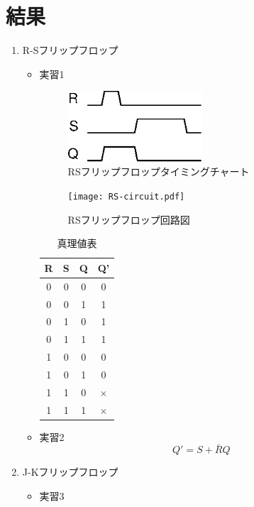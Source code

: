 \documentclass[dvipdfmx]{jsarticle}
\begin{document}
	\section{結果}
		\begin{enumerate}
			\item R-Sフリップフロップ
				\begin{itemize}
					\item 実習1
						\begin{figure}
							\center
							\includegraphics[width=5cm]{rs.eps}
							\caption{RSフリップフロップタイミングチャート}
						\end{figure}
						\begin{figure}
							\center
							\texttt{[image: RS-circuit.pdf]}
							\caption{RSフリップフロップ回路図}
						\end{figure}
						\begin{table}[H]
							\center
							\caption{真理値表}
							\begin{tabular}{|c|c|c|c|}
								\hline
								R & S & Q & Q' \\ \hline
								0 & 0 & 0 & 0 \\ \hline
								0 & 0 & 1 & 1 \\ \hline
								0 & 1 & 0 & 1 \\ \hline
								0 & 1 & 1 & 1 \\ \hline
								1 & 0 & 0 & 0 \\ \hline
								1 & 0 & 1 & 0 \\ \hline
								1 & 1 & 0 & $\times$ \\ \hline
								1 & 1 & 1 & $\times$ \\ \hline
							\end{tabular}
						\end{table}
					\item 実習2
						\begin{equation}
							Q' = S + \bar{R} Q
						\end{equation}
				\end{itemize}
			\item J-Kフリップフロップ
				\begin{itemize}
					\item 実習3

\end{itemize}
\end{enumerate}
\end{document}
